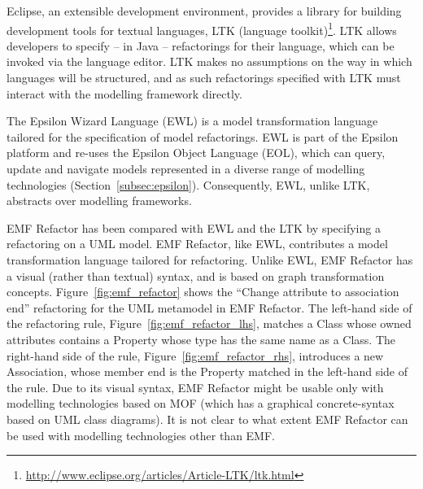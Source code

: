 Eclipse, an extensible development environment, provides a library for building development tools for textual languages, LTK (language toolkit)\footnote{\url{http://www.eclipse.org/articles/Article-LTK/ltk.html}}. LTK allows developers to specify -- in Java -- refactorings for their language, which can be invoked via the language editor. LTK makes no assumptions on the way in which languages will be structured, and as such refactorings specified with LTK must interact with the modelling framework directly.

The Epsilon Wizard Language (EWL) \cite{kolovos07ewl} is a model transformation language tailored for the specification of model refactorings. EWL is part of the Epsilon platform and re-uses the Epsilon Object Language (EOL), which can query, update and navigate models represented in a diverse range of modelling technologies (Section~\ref{subsec:epsilon}). Consequently, EWL, unlike LTK, abstracts over modelling frameworks.

EMF Refactor \cc \cite{arendt09refactoring} has been compared with EWL and the LTK by specifying a refactoring on a UML model. EMF Refactor, like EWL, contributes a model transformation language tailored for refactoring. Unlike EWL, EMF Refactor has a visual (rather than textual) syntax, and is based on graph transformation concepts. Figure~\ref{fig:emf_refactor} shows the ``Change attribute to association end'' refactoring for the UML metamodel in EMF Refactor. The left-hand side of the refactoring rule, Figure~\ref{fig:emf_refactor_lhs}, matches a Class whose owned attributes contains a Property whose type has the same name as a Class. The right-hand side of the rule, Figure~\ref{fig:emf_refactor_rhs}, introduces a new Association, whose member end is the Property matched in the left-hand side of the rule. Due to its visual syntax, EMF Refactor might be usable only with modelling technologies based on MOF (which has a graphical concrete-syntax based on UML class diagrams). It is not clear to what extent EMF Refactor can be used with modelling technologies other than EMF.

